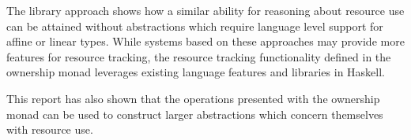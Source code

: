 \documentclass[onehalf,11pt]{beavtex}
\begin{document}
The library approach shows how a similar ability for reasoning about resource use
can be attained without abstractions which require language level support for
affine or linear types.
While systems based on these approaches may provide more features for resource
tracking, the resource tracking functionality defined in the ownership
monad leverages existing language features and libraries in Haskell.

This report has also shown that the operations presented with the ownership monad
can be used to construct larger abstractions which concern themselves with
resource use.


{}

\end{document}
